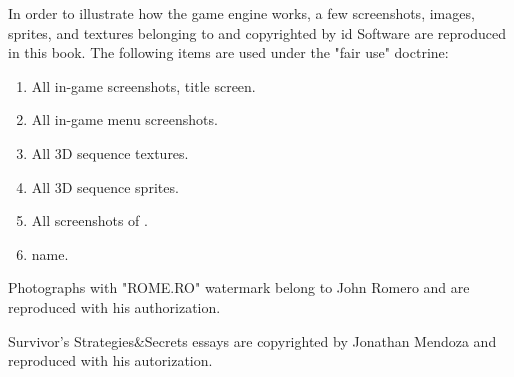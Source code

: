 In order to illustrate how the \doom{} game engine works, a few screenshots, images, sprites, and textures belonging to and copyrighted by id Software are reproduced in this book. The following items are used under the "fair use" doctrine:\\
\par
\begin{enumerate}
	\item All in-game screenshots, title screen.
	\item All in-game menu screenshots.
	\item All 3D sequence textures.
    \item All 3D sequence sprites.
    \item All screenshots of \doom.
    \item \doom{} name.
\end{enumerate}
\par
Photographs with "ROME.RO" watermark belong to John Romero and are reproduced with his authorization.\\
\par
\doom{} Survivor’s Strategies\&Secrets essays are copyrighted by Jonathan Mendoza and reproduced with his autorization.\\
